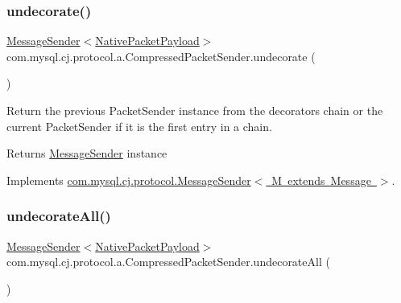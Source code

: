 \subsubsection{\texorpdfstring{undecorate()}{undecorate()}}
{\footnotesize\ttfamily \mbox{\hyperlink{interfacecom_1_1mysql_1_1cj_1_1protocol_1_1_message_sender}{Message\+Sender}}$<$\mbox{\hyperlink{classcom_1_1mysql_1_1cj_1_1protocol_1_1a_1_1_native_packet_payload}{Native\+Packet\+Payload}}$>$ com.\+mysql.\+cj.\+protocol.\+a.\+Compressed\+Packet\+Sender.\+undecorate (\begin{DoxyParamCaption}{ }\end{DoxyParamCaption})}

Return the previous Packet\+Sender instance from the decorators chain or the current Packet\+Sender if it is the first entry in a chain.

\begin{DoxyReturn}{Returns}
\mbox{\hyperlink{interfacecom_1_1mysql_1_1cj_1_1protocol_1_1_message_sender}{Message\+Sender}} instance 
\end{DoxyReturn}


Implements \mbox{\hyperlink{interfacecom_1_1mysql_1_1cj_1_1protocol_1_1_message_sender_a3a352bf35ad98dc6cea7c1f4ac9480da}{com.\+mysql.\+cj.\+protocol.\+Message\+Sender$<$ M extends Message $>$}}.

\mbox{\label{classcom_1_1mysql_1_1cj_1_1protocol_1_1a_1_1_compressed_packet_sender_a06ec74d67adf77498b1f95148cd59323}} 
\subsubsection{\texorpdfstring{undecorate\+All()}{undecorateAll()}}
{\footnotesize\ttfamily \mbox{\hyperlink{interfacecom_1_1mysql_1_1cj_1_1protocol_1_1_message_sender}{Message\+Sender}}$<$\mbox{\hyperlink{classcom_1_1mysql_1_1cj_1_1protocol_1_1a_1_1_native_packet_payload}{Native\+Packet\+Payload}}$>$ com.\+mysql.\+cj.\+protocol.\+a.\+Compressed\+Packet\+Sender.\+undecorate\+All (\begin{DoxyParamCaption}{ }\end{DoxyParamCaption})}

